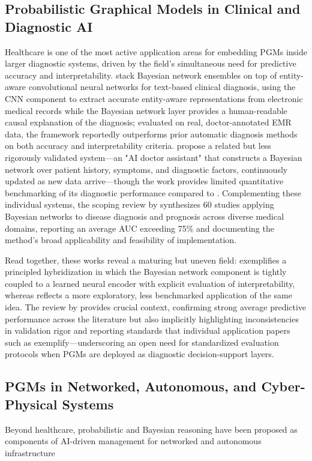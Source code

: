 \subsection{Probabilistic Graphical Models in Clinical and Diagnostic AI}
Healthcare is one of the most active application areas for embedding PGMs inside larger diagnostic systems, driven by the field's simultaneous need for predictive accuracy and interpretability. \cite{chen2020interpretable} stack Bayesian network ensembles on top of entity-aware convolutional neural networks for text-based clinical diagnosis, using the CNN component to extract accurate entity-aware representations from electronic medical records while the Bayesian network layer provides a human-readable causal explanation of the diagnosis; evaluated on real, doctor-annotated EMR data, the framework reportedly outperforms prior automatic diagnosis methods on both accuracy and interpretability criteria. \cite{selvaraj2024artificial} propose a related but less rigorously validated system---an "AI doctor assistant" that constructs a Bayesian network over patient history, symptoms, and diagnostic factors, continuously updated as new data arrive---though the work provides limited quantitative benchmarking of its diagnostic performance compared to \cite{chen2020interpretable}. Complementing these individual systems, the scoping review by \cite{polotskaya2024bayesian} synthesizes 60 studies applying Bayesian networks to disease diagnosis and prognosis across diverse medical domains, reporting an average AUC exceeding 75\% and documenting the method's broad applicability and feasibility of implementation.

Read together, these works reveal a maturing but uneven field: \cite{chen2020interpretable} exemplifies a principled hybridization in which the Bayesian network component is tightly coupled to a learned neural encoder with explicit evaluation of interpretability, whereas \cite{selvaraj2024artificial} reflects a more exploratory, less benchmarked application of the same idea. The review by \cite{polotskaya2024bayesian} provides crucial context, confirming strong average predictive performance across the literature but also implicitly highlighting inconsistencies in validation rigor and reporting standards that individual application papers such as \cite{selvaraj2024artificial} exemplify---underscoring an open need for standardized evaluation protocols when PGMs are deployed as diagnostic decision-support layers.

\subsection{PGMs in Networked, Autonomous, and Cyber-Physical Systems}
Beyond healthcare, probabilistic and Bayesian reasoning have been proposed as components of AI-driven management for networked and autonomous infrastructure

